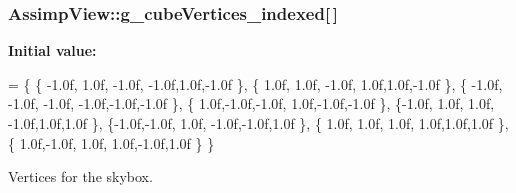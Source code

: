 \hypertarget{namespace_assimp_view_a0861f5fdb463a7181ac999ec09cf07d3}{
\subsubsection[{g\+\_\+cube\+Vertices\+\_\+indexed}]{ Assimp\+View\+::g\+\_\+cube\+Vertices\+\_\+indexed\mbox{[}$\,$\mbox{]}}}\label{namespace_assimp_view_a0861f5fdb463a7181ac999ec09cf07d3}
{\bfseries Initial value\+:}
\begin{DoxyCode}
=
\{
    \{ -1.0f, 1.0f, -1.0f,   -1.0f,1.0f,-1.0f \},     
    \{ 1.0f, 1.0f,  -1.0f,   1.0f,1.0f,-1.0f \},      
    \{ -1.0f, -1.0f, -1.0f,  -1.0f,-1.0f,-1.0f \},    
    \{ 1.0f,-1.0f,-1.0f,      1.0f,-1.0f,-1.0f \},    
    \{-1.0f, 1.0f, 1.0f,     -1.0f,1.0f,1.0f \},      
    \{-1.0f,-1.0f, 1.0f,     -1.0f,-1.0f,1.0f \},     
    \{ 1.0f, 1.0f, 1.0f,     1.0f,1.0f,1.0f \},       
    \{ 1.0f,-1.0f, 1.0f,     1.0f,-1.0f,1.0f \}       
\}
\end{DoxyCode}


Vertices for the skybox. 

